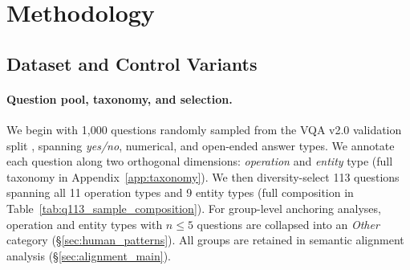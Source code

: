 
\section{Methodology}
\label{sec:setup}

\subsection{Dataset and Control Variants}
\label{sec:dataset}

\paragraph{Question pool, taxonomy, and selection.}
We begin with 1{,}000 questions randomly sampled from the VQA v2.0 validation split
\citep{goyal2016making}, spanning \textit{yes/no}, numerical, and open-ended answer types.
We annotate each question along two orthogonal dimensions: \emph{operation} and \emph{entity} type (full taxonomy in Appendix~\ref{app:taxonomy}). 
We then diversity-select 113 questions spanning all 11 operation types and 9 entity types (full composition in Table~\ref{tab:q113_sample_composition}). %
For group-level anchoring analyses, operation and entity types with $n \leq 5$ questions are collapsed into an \emph{Other} category (\S\ref{sec:human_patterns}). %
All groups are retained in semantic alignment analysis (\S\ref{sec:alignment_main}). %

